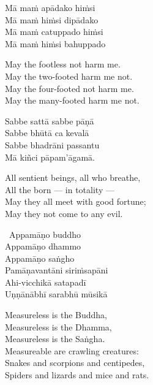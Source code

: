 \ifninebythirteen\clearpage\fi

\begin{pali-hang-continued}
  Mā maṁ apādako hiṁsi\\
  Mā maṁ hiṁsi dipādako\\
  Mā maṁ catuppado hiṁsi\\
  Mā maṁ hiṁsi bahuppado
\end{pali-hang-continued}

\ifbfive\clearpage\fi

\begin{english-verses}
  May the footless not harm me.\\
  May the two-footed harm me not.\\
  May the four-footed not harm me.\\
  May the many-footed harm me not.
\end{english-verses}

\begin{pali-hang-continued}
  Sabbe sattā sabbe pāṇā\\
  Sabbe bhūtā ca kevalā\\
  Sabbe bhadrāni passantu\\
  Mā kiñci pāpam'āgamā.
\end{pali-hang-continued}

\begin{english-verses}
  All sentient beings, all who breathe,\\
  All the born — in totality —\\
  May they all meet with good fortune;\\
  May they not come to any evil.
\end{english-verses}

\begin{pali-hang-continued}
  \anglebracketleft\ \hspace{-0.5mm}Appamāṇo buddho \hspace{-0.5mm}\anglebracketright\ \\
  Appamāṇo dhammo\\
  Appamāṇo saṅgho\\
  Pamāṇavantāni siriṁsapāni\\
  Ahi-vicchikā satapadī\\
  Uṇṇānābhī sarabhū mūsikā
\end{pali-hang-continued}

\ifninebythirteen\clearpage\fi

\begin{english-verses}
  Measureless is the Buddha,\\
  Measureless is the Dhamma,\\
  Measureless is the Saṅgha.\\
  Measureable are crawling creatures:\\
  Snakes and scorpions and centipedes,\\
  Spiders and lizards and mice and rats.
\end{english-verses}

